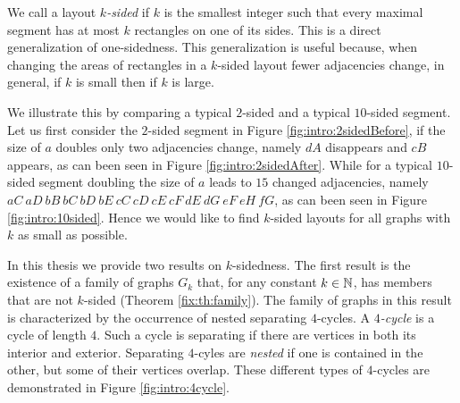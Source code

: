   We call a layout \emph{$k$-sided} if $k$ is the smallest integer such that every maximal segment has at most $k$ rectangles on one of its sides. This is a direct generalization of one-sidedness.
  This generalization is useful because, when changing the areas of rectangles in a $k$-sided layout fewer adjacencies change, in general, if $k$ is small then if $k$ is large.

  We illustrate this by comparing a typical $2$-sided and a typical $10$-sided segment.
  Let us first consider the $2$-sided segment in Figure \ref{fig:intro:2sidedBefore}, if the size of $a$ doubles only two adjacencies change, namely $dA$ disappears and $cB$ appears, as can been seen in Figure \ref{fig:intro:2sidedAfter}.
  While for a typical $10$-sided segment doubling the size of $a$ leads to $15$ changed adjacencies, namely $aC\ aD\ bB\ bC\ bD\ bE\ cC\ cD\ cE\ cF\ dE\ dG\ eF\ eH\ fG$, as can been seen in Figure \ref{fig:intro:10sided}.
  Hence we would like to find $k$-sided layouts for all graphs with $k$ as small as possible.


  In this thesis we provide two results on $k$-sidedness. The first result is the existence of a family of graphs $G_k$ that, for any constant $k \in \mathbb{N}$, has members that are not $k$-sided (Theorem \ref{fix:th:family}). The family of graphs in this result is characterized by the occurrence of nested separating $4$-cycles.
  A \emph{$4$-cycle} is a cycle of length $4$.
  Such a cycle is separating if there are vertices in both its interior and exterior.
  Separating $4$-cyles are \emph{nested} if one is contained in the other, but some of their vertices overlap. These different types of $4$-cycles are demonstrated in Figure \ref{fig:intro:4cycle}.

